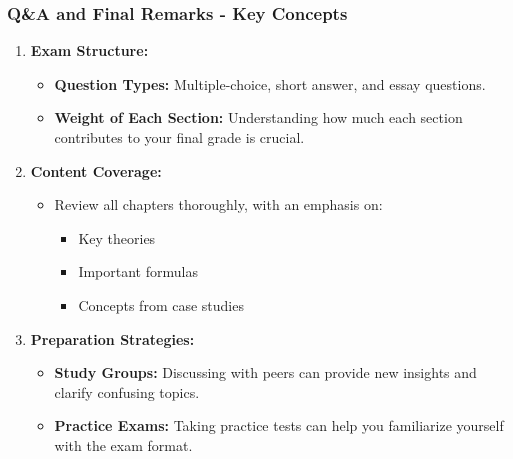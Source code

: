 \documentclass{beamer}
\begin{document}
\begin{frame}[fragile]
    \frametitle{Q\&A and Final Remarks - Key Concepts}
    \begin{enumerate}
        \item \textbf{Exam Structure:}
        \begin{itemize}
            \item \textbf{Question Types:} Multiple-choice, short answer, and essay questions.
            \item \textbf{Weight of Each Section:} Understanding how much each section contributes to your final grade is crucial.
        \end{itemize}
        
        \item \textbf{Content Coverage:}
        \begin{itemize}
            \item Review all chapters thoroughly, with an emphasis on:
            \begin{itemize}
                \item Key theories
                \item Important formulas
                \item Concepts from case studies
            \end{itemize}
        \end{itemize}
        
        \item \textbf{Preparation Strategies:}
        \begin{itemize}
            \item \textbf{Study Groups:} Discussing with peers can provide new insights and clarify confusing topics.
            \item \textbf{Practice Exams:} Taking practice tests can help you familiarize yourself with the exam format.
        \end{itemize}
    \end{enumerate}
\end{frame}
\end{document}
